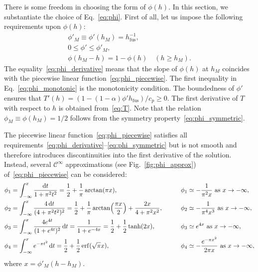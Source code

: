 \documentclass[final]{elsarticle} %
\newcommand{\fusion}[1]{{#1}_\text{fus}}
\begin{document}
There is some freedom in choosing the form of $\phi(h)$.
In this section, we substantiate the choice of Eq.~\eqref{eq:phi}.
First of all, let us impose the following requirements upon $\phi(h)$:
\begin{gather}
    \phi'_M \equiv \phi'(h_M) = \fusion{h}^{-1}, \label{eq:phi_derivative}\\
    0 \leq \phi' \leq \phi'_M, \label{eq:phi_monotonic}\\
    \phi(h_M - h) = 1-\phi(h) \quad (h\geq h_M). \label{eq:phi_symmetric}
\end{gather}
The equality~\eqref{eq:phi_derivative} means that the slope of $\phi(h)$ at $h_M$
coincides with the piecewise linear function~\eqref{eq:phi_piecewise}.
The first inequality in Eq.~\eqref{eq:phi_monotonic} is the monotonicity condition.
The boundedness of $\phi'$ ensures that $T'(h) = (1-(1-\alpha)\phi'\fusion{h})/c_p \geq 0$.
The first derivative of $T$ with respect to $h$ is obtained from~\eqref{eq:T}.
Note that the relation $\phi_M \equiv \phi(h_M) = 1/2$ follows from the symmetry property~\eqref{eq:phi_symmetric}.

The piecewise linear function~\eqref{eq:phi_piecewise} satisfies all
requirements~\eqref{eq:phi_derivative}--\eqref{eq:phi_symmetric}
but is not smooth and therefore introduces discontinuities
into the first derivative of the solution.
Instead, several $\mathcal{C}^\infty$ approximations (see Fig.~\ref{fig:phi_approx})
of~\eqref{eq:phi_piecewise} can be considered:
\begin{alignat}{2}
    \phi_1 &= \int_{-\infty}^{x} \frac{\dd{t}}{1+\pi^2 t^2}
        = \frac12 + \frac1\pi\arctan(\pi x), \qquad
        &\phi_1 &\simeq -\frac1{\pi^2x} \text{ as } x\to-\infty, \label{eq:phi1}\\
    \phi_2 &= \int_{-\infty}^{x} \frac{4\dd{t}}{(4+\pi^2 t^2)^2}
        = \frac12 + \frac1\pi\arctan(\frac{\pi x}2) + \frac{2x}{4+\pi^2x^2}, \qquad
        &\phi_2 &\simeq -\frac1{\pi^4x^3} \text{ as } x\to-\infty, \label{eq:phi2}\\
    \phi_3 &= \int_{-\infty}^{x} \frac{4e^{4t}}{(1+e^{4t})^2}\dd{t}
        = \frac1{1+e^{-4x}} = \frac12 + \frac12\tanh(2x), \qquad
        &\phi_3 &\simeq e^{4x} \text{ as } x\to-\infty, \label{eq:phi3}\\
    \phi_4 &= \int_{-\infty}^{x} e^{-\pi t^2}\dd{t} = \frac12 + \frac12\erf(\sqrt\pi x), \qquad
        &\phi_4 &\simeq -\frac{e^{-\pi x^2}}{2\pi x} \text{ as } x\to-\infty, \label{eq:phi4}
\end{alignat}
where $x = \phi'_M(h-h_M)$.
\end{document}
